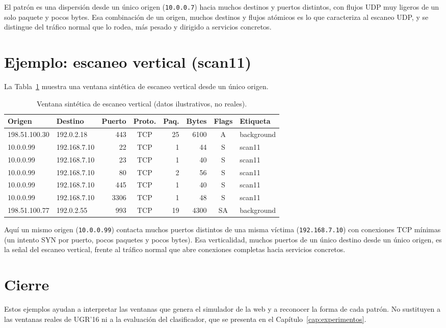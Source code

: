El patrón es una dispersión desde un único origen (\texttt{10.0.0.7}) hacia muchos destinos y puertos distintos, con flujos UDP muy ligeros de un solo paquete y pocos bytes. Esa combinación de un origen, muchos destinos y flujos atómicos es lo que caracteriza al escaneo UDP, y se distingue del tráfico normal que lo rodea, más pesado y dirigido a servicios concretos.

\section{Ejemplo: escaneo vertical (scan11)}
\label{sec:ape_scan11}

La Tabla~\ref{tab:ape_scan11} muestra una ventana sintética de escaneo vertical desde un único origen.

\begin{table}[ht]
\centering
\small
\begin{tabular}{|l|l|r|c|r|r|c|l|}
\hline
\textbf{Origen} & \textbf{Destino} & \textbf{Puerto} & \textbf{Proto.} & \textbf{Paq.} & \textbf{Bytes} & \textbf{Flags} & \textbf{Etiqueta} \\
\hline
198.51.100.30 & 192.0.2.18 & 443 & TCP & 25 & 6100 & A & background \\
\hline
10.0.0.99 & 192.168.7.10 & 22 & TCP & 1 & 44 & S & scan11 \\
\hline
10.0.0.99 & 192.168.7.10 & 23 & TCP & 1 & 40 & S & scan11 \\
\hline
10.0.0.99 & 192.168.7.10 & 80 & TCP & 2 & 56 & S & scan11 \\
\hline
10.0.0.99 & 192.168.7.10 & 445 & TCP & 1 & 40 & S & scan11 \\
\hline
10.0.0.99 & 192.168.7.10 & 3306 & TCP & 1 & 48 & S & scan11 \\
\hline
198.51.100.77 & 192.0.2.55 & 993 & TCP & 19 & 4300 & SA & background \\
\hline
\end{tabular}
\caption{Ventana sintética de escaneo vertical (datos ilustrativos, no reales).}
\label{tab:ape_scan11}
\end{table}

Aquí un mismo origen (\texttt{10.0.0.99}) contacta muchos puertos distintos de una misma víctima (\texttt{192.168.7.10}) con conexiones TCP mínimas (un intento SYN por puerto, pocos paquetes y pocos bytes). Esa verticalidad, muchos puertos de un único destino desde un único origen, es la señal del escaneo vertical, frente al tráfico normal que abre conexiones completas hacia servicios concretos.

\section{Cierre}
\label{sec:ape_cierre}

Estos ejemplos ayudan a interpretar las ventanas que genera el simulador de la web y a reconocer la forma de cada patrón. No sustituyen a las ventanas reales de UGR'16 ni a la evaluación del clasificador, que se presenta en el Capítulo~\ref{cap:experimentos}.
